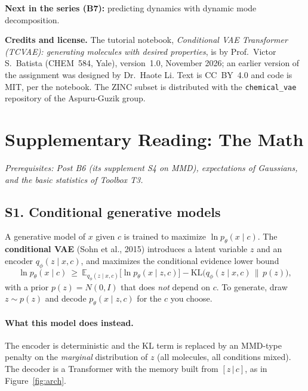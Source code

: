 \documentclass[11pt]{article}
\newcommand{\E}{\mathbb{E}}
\begin{document}
\textbf{Next in the series (B7):} predicting dynamics with dynamic mode decomposition.

\vspace{0.5em}
{\footnotesize\textbf{Credits and license.} The tutorial notebook, \textit{Conditional VAE Transformer (TCVAE): generating molecules with desired properties}, is by Prof.\ Victor S.\ Batista (CHEM~584, Yale), version~1.0, November 2026; an earlier version of the assignment was designed by Dr.\ Haote Li. Text is CC~BY~4.0 and code is MIT, per the notebook. The ZINC subset is distributed with the \texttt{chemical\_vae} repository of the Aspuru-Guzik group.}

\clearpage
\section*{Supplementary Reading: The Math}
\textit{Prerequisites: Post B6 (its supplement S4 on MMD), expectations of Gaussians, and the basic statistics of Toolbox T3.}

\label{sec:S1}
\subsection*{S1. Conditional generative models}
A generative model of $x$ given $c$ is trained to maximize $\ln p_\theta(x\mid c)$. The \textbf{conditional VAE} (Sohn et al., 2015) introduces a latent variable $z$ and an encoder $q_\phi(z\mid x,c)$, and maximizes the conditional evidence lower bound
\[
  \ln p_\theta(x\mid c)\ \ge\ \E_{q_\phi(z\mid x,c)}\!\big[\ln p_\theta(x\mid z,c)\big]-\mathrm{KL}\big(q_\phi(z\mid x,c)\,\big\|\,p(z)\big),
\]
with a prior $p(z)=N(0,I)$ that does \emph{not} depend on $c$. To generate, draw $z\sim p(z)$ and decode $p_\theta(x\mid z,c)$ for the $c$ you choose.

\paragraph{What this model does instead.} The encoder is deterministic and the KL term is replaced by an MMD-type penalty on the \emph{marginal} distribution of $z$ (all molecules, all conditions mixed). The decoder is a Transformer with the memory built from $[z\,|\,c]$, as in Figure~\ref{fig:arch}.
\end{document}
